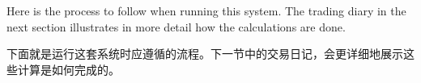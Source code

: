 
\begin{englishblock} Here is the process to follow when running this system. The trading diary in the next section illustrates in more detail how the calculations are done. \end{englishblock}

\begin{chineseblock}下面就是运行这套系统时应遵循的流程。下一节中的交易日记，会更详细地展示这些计算是如何完成的。\end{chineseblock}


\begin{bilingualtableblock} 
\end{bilingualtableblock}
